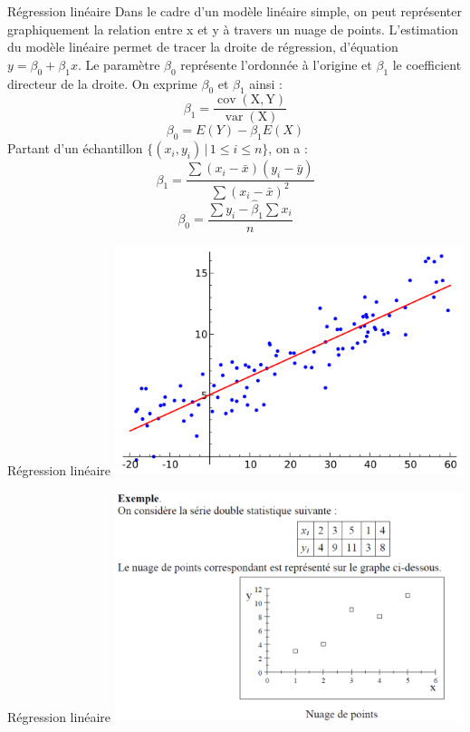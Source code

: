 \documentclass[10pt, french]{beamer}
\begin{document}
\begin{frame}{Régression linéaire}
Dans le cadre d'un modèle linéaire simple, on peut représenter graphiquement la relation entre x et y à travers un nuage de points. L'estimation du modèle linéaire permet de tracer la droite de régression, d'équation $y=\beta _{0}+\beta _{1}x$. Le paramètre $\beta _{0}$ représente l'ordonnée à l'origine et $\beta _{1}$ le coefficient directeur de la droite.
On  exprime $\beta _{0}$ et $\beta _{1}$ ainsi :
$$\beta_{1}={\frac {\operatorname {cov} (\mathrm {X} ,\mathrm {Y} )}{\operatorname {var} (\mathrm {X} )}}$$
$$\beta_0 =E(Y) - \beta_1 E(X)$$
Partant d'un échantillon $ \{(x_{i},y_{i})\,|\,1\leq i\leq n\}$, on a :
$$\beta_{1}={\frac {\sum (x_{i}-{\bar {x}})(y_{i}-{\bar {y}})}{\sum (x_{i}-{\bar {x}})^{2}}}$$
$$\beta_{0}={\frac {\sum y_{i}-{\hat {\beta }}_{1}\sum x_{i}}{n}}$$
\end{frame}
\begin{frame}{Régression linéaire}
\includegraphics[width=4in]{Images/linear_regression.png}
\end{frame}
\begin{frame}{Régression linéaire}
\includegraphics[width=4in]{Images/reg_exo.png}
\end{frame}
\end{document}
